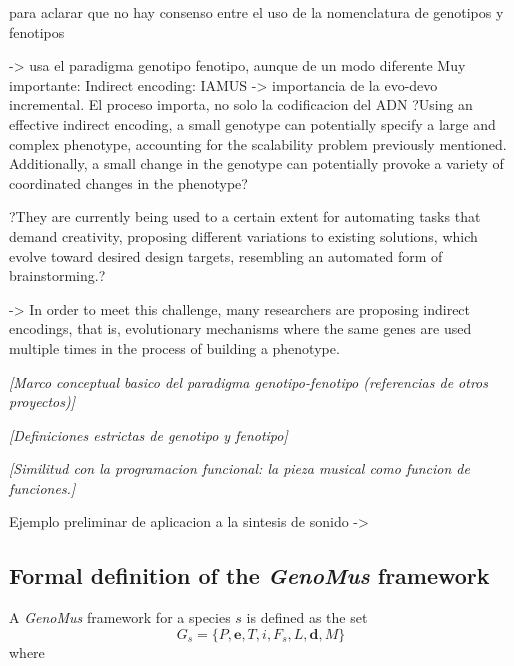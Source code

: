 \documentclass{article}
\renewcommand{\vec}[1]{\mathbf{#1}}
\begin{document}
{\color{red}


para aclarar que no hay consenso entre el uso de la nomenclatura de genotipos y fenotipos \cite{Sulyok2019}

\cite{SnchezQuintana2013} -> usa el paradigma genotipo fenotipo, aunque de un modo diferente
Muy importante: Indirect encoding: IAMUS -> importancia de la evo-devo incremental. El proceso importa, no solo la codificacion del ADN
?Using an effective indirect encoding, a small
genotype can potentially specify a large and complex
phenotype, accounting for the scalability problem
previously mentioned. Additionally, a small change
in the genotype can potentially provoke a variety of
coordinated changes in the phenotype?

?They are currently
being used to a certain extent for automating
tasks that demand creativity, proposing different
variations to existing solutions, which evolve toward
desired design targets, resembling an automated form
of brainstorming.?


\cite{stanley:alife03} -> In order to meet this
challenge, many researchers are proposing indirect
encodings, that is, evolutionary mechanisms where the same
genes are used multiple times in the process of building a
phenotype.

}

{\color{gray} \textsl{[Marco conceptual basico del paradigma genotipo-fenotipo (referencias de otros proyectos)]}}

{\color{gray} \textsl{[Definiciones estrictas de genotipo y fenotipo]}}


{\color{gray} \textsl{[Similitud con la programacion funcional: la pieza musical como funcion de funciones.]}}



{\color{red}

Ejemplo preliminar de aplicacion a la sintesis de sonido -> \cite{microcontrapunctus}
}



\subsection{Formal definition of the \textsl{GenoMus} framework}

A \textsl{GenoMus} framework for a species $s$ is defined as the set $$G_s = \{P, \vec{e}, T, i, F_s, L, \vec{d}, M\}$$ where
\end{document}

